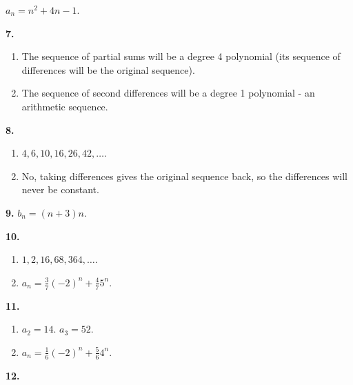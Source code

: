 \documentclass[10pt,]{book}
\theoremstyle{plain}
\theoremstyle{definition}
\theoremstyle{definition}
\theoremstyle{definition}
\numberwithin{equation}{chapter}
\begin{document}
            \(a_n = n^2 + 4n - 1\).
\par\smallskip
\noindent\textbf{7.}\quad{}\leavevmode%
\begin{enumerate}[label=(\alph*)]
\item\hypertarget{li-983}{}
                The sequence of partial sums will be a degree 4 polynomial (its sequence of differences will be the original sequence).
\item\hypertarget{li-984}{}
                The sequence of second differences will be a degree 1 polynomial - an arithmetic sequence.
\end{enumerate}
\par\smallskip
\noindent\textbf{8.}\quad{}\leavevmode%
\begin{enumerate}[label=(\alph*)]
\item\hypertarget{li-987}{}\(4, 6, 10, 16, 26, 42, \ldots\).%
\item\hypertarget{li-988}{}
                No, taking differences gives the original sequence back, so the differences will never be constant.
\end{enumerate}
\par\smallskip
\noindent\textbf{9.}\quad{}
            \(b_n = (n+3)n\).
\par\smallskip
\noindent\textbf{10.}\quad{}\leavevmode%
\begin{enumerate}[label=(\alph*)]
\item\hypertarget{li-991}{}\(1, 2, 16,68, 364, \ldots\).%
\item\hypertarget{li-992}{}\(a_n = \frac{3}{7}(-2)^n + \frac{4}{7}5^n\).%
\end{enumerate}
\par\smallskip
\noindent\textbf{11.}\quad{}\leavevmode%
\begin{enumerate}[label=(\alph*)]
\item\hypertarget{li-995}{}\(a_2 = 14\). \(a_3 = 52\).%
\item\hypertarget{li-996}{}\(a_n = \frac{1}{6}(-2)^n + \frac{5}{6}4^n\).%
\end{enumerate}
\par\smallskip
\noindent\textbf{12.}\quad{}\leavevmode%
\end{document}
